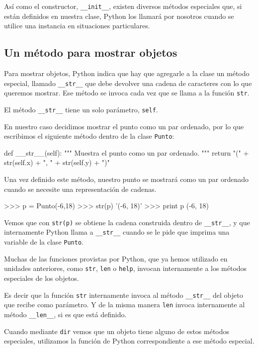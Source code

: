 Así como el constructor, \lstinline!__init__!, existen diversos métodos
especiales que, si están definidos en nuestra clase, Python los llamará por
nosotros cuando se utilice una instancia en situaciones particulares.

\subsection{Un método para mostrar objetos}

Para mostrar objetos, Python indica que hay que agregarle a la clase un
método especial, llamado \lstinline+__str__+ que debe devolver una cadena
de caracteres con lo que queremos mostrar. Ese método se invoca cada vez
que se llama a la función \lstinline!str!.

El método \lstinline+__str__+ tiene un solo parámetro, \lstinline!self!.

En nuestro caso decidimos mostrar el punto como un par ordenado, por lo que
escribimos el siguiente método dentro de la clase \lstinline!Punto!:

\begin{codigo-python-sn}
    def __str__(self):
        """ Muestra el punto como un par ordenado. """
        return "(" + str(self.x) + ", " + str(self.y) + ")"
\end{codigo-python-sn}

Una vez definido este método, nuestro punto se mostrará como un par
ordenado cuando se necesite una representación de cadenas.

\begin{codigo-python-sn}
>>> p = Punto(-6,18)
>>> str(p)
'(-6, 18)'
>>> print p
(-6, 18)
\end{codigo-python-sn}

Vemos que con \lstinline!str(p)! se obtiene la cadena construida dentro de
\lstinline!__str__!, y que internamente Python llama a \lstinline!__str__!
cuando se le pide que imprima una variable de la clase \lstinline!Punto!.

\begin{sabias_que}
Muchas de las funciones provistas por Python, que ya hemos utilizado en
unidades anteriores, como \lstinline!str!, \lstinline!len! o
\lstinline!help!, invocan internamente a los métodos especiales de los
objetos.

Es decir que la función \lstinline!str!  internamente invoca al método
\lstinline!__str__! del objeto que recibe como parámetro. Y de la misma
manera \lstinline!len! invoca internamente al método \lstinline!__len__!,
si es que está definido.

Cuando mediante \lstinline!dir! vemos que un objeto tiene alguno de estos
métodos especiales, utilizamos la función de Python correspondiente
a ese método especial.
\end{sabias_que}

